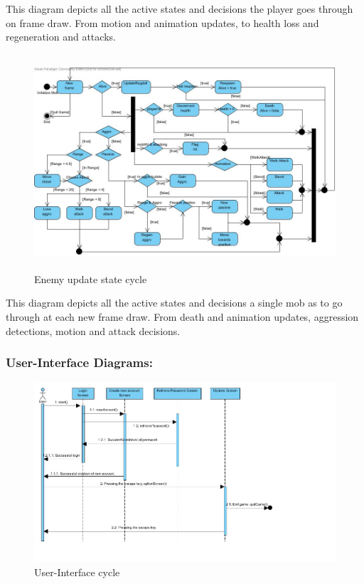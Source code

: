 \documentclass[letterpaper]{article}
\begin{document}
					This diagram depicts all the active states and decisions the player goes through on frame draw. From motion and animation updates, to health loss and regeneration and attacks.
					
					\begin{figure}[H]
					\centering
					\includegraphics[width=180mm, height=80mm]{UML_Diagram/State/Mob_State.jpg}
					\caption{Enemy update state cycle}
					\label{overflow}
					\end{figure}
					
					This diagram depicts all the active states and decisions a single mob as to go through at each new frame draw. From death and animation updates, aggression detections, motion and attack decisions.
			
				\subsubsection*{User-Interface Diagrams:}
				\vspace{0.1in}
				
					\begin{figure}[H]
					\centering
					\includegraphics[width=180mm]{UML_Diagram/Sequence/GUI_Screens.jpg}
					\caption{User-Interface cycle}
					\label{overflow}
					\end{figure}
					
\end{document}
